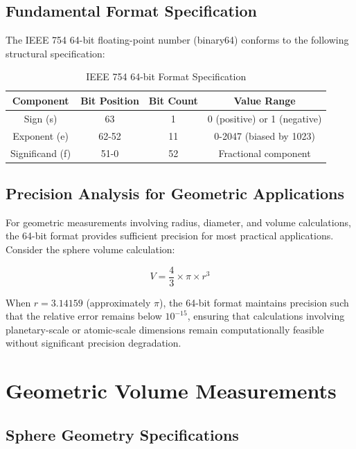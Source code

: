 \documentclass[12pt]{book}
\begin{document}
\section{Fundamental Format Specification}

The IEEE 754 64-bit floating-point number (binary64) conforms to the following structural specification:

\begin{table}[h]
\centering
\begin{tabular}{|c|c|c|c|}
\hline
Component & Bit Position & Bit Count & Value Range \\
\hline
Sign (s) & 63 & 1 & 0 (positive) or 1 (negative) \\
\hline
Exponent (e) & 62-52 & 11 & 0-2047 (biased by 1023) \\
\hline
Significand (f) & 51-0 & 52 & Fractional component \\
\hline
\end{tabular}
\caption{IEEE 754 64-bit Format Specification}
\end{table}

\section{Precision Analysis for Geometric Applications}

For geometric measurements involving radius, diameter, and volume calculations, the 64-bit format provides sufficient precision for most practical applications. Consider the sphere volume calculation:

\begin{equation}
\label{eq:sphere_volume}
V = \frac{4}{3} \times \pi \times r^3
\end{equation}

When $r = 3.14159$ (approximately $\pi$), the 64-bit format maintains precision such that the relative error remains below $10^{-15}$, ensuring that calculations involving planetary-scale or atomic-scale dimensions remain computationally feasible without significant precision degradation.

\chapter{Geometric Volume Measurements}

\section{Sphere Geometry Specifications}
\end{document}
